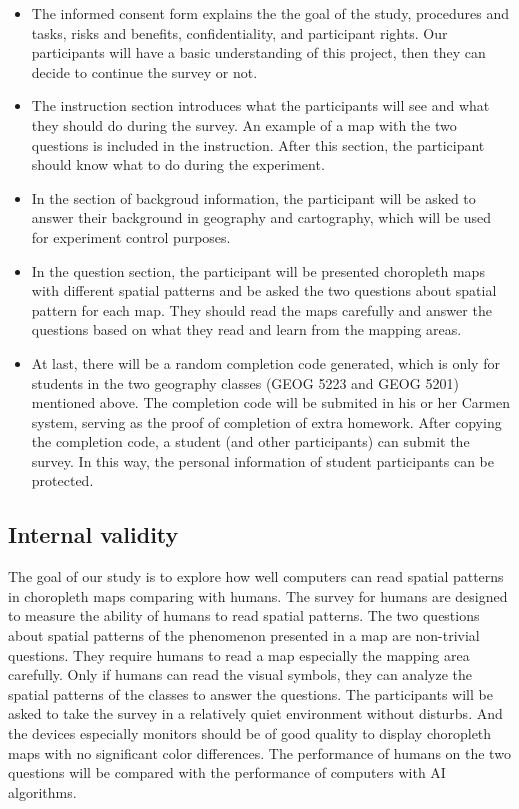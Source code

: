 \begin{itemize}
    \item The informed consent form explains the the goal of the study, procedures and tasks, risks and benefits, confidentiality, and participant rights. Our participants will have a basic understanding of this project, then they can decide to continue the survey or not. 
    
    \item The instruction section introduces what the participants will see and what they should do during the survey. An example of a map with the two questions is included in the instruction. After this section, the participant should know what to do during the experiment. 

    \item In the section of backgroud information, the participant will be asked to answer their background in geography and cartography, which will be used for experiment control purposes.

    \item In the question section, the participant will be presented choropleth maps with different spatial patterns and be asked the two questions about spatial pattern for each map. They should read the maps carefully and answer the questions based on what they read and learn from the mapping areas.

    \item At last, there will be a random completion code generated, which is only for students in the two geography classes (GEOG 5223 and GEOG 5201) mentioned above. The completion code will be submited in his or her Carmen system, serving as the proof of completion of extra homework. After copying the completion code, a student (and other participants) can submit the survey. In this way, the personal information of student participants can be protected.
\end{itemize}

\subsection{Internal validity}

The goal of our study is to explore how well computers can read spatial patterns in choropleth maps comparing with humans. The survey for humans are designed to measure the ability of humans to read spatial patterns. The two questions about spatial patterns of the phenomenon presented in a map are non-trivial questions. They require humans to read a map especially the mapping area carefully. Only if humans can read the visual symbols, they can analyze the spatial patterns of the classes to answer the questions. The participants will be asked to take the survey in a relatively quiet environment without disturbs. And the devices especially monitors should be of good quality to display choropleth maps with no significant color differences. The performance of humans on the two questions will be compared with the performance of computers with AI algorithms.

